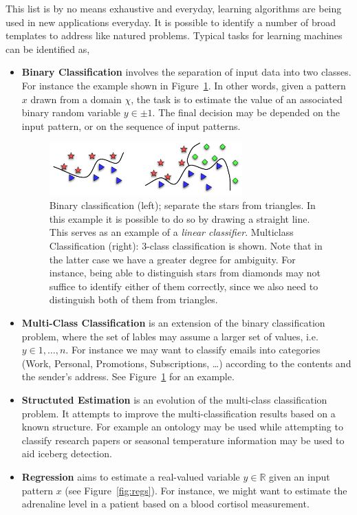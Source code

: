 This list is by no means exhaustive and everyday, learning algorithms are being used in new applications everyday. It is possible to identify a number of broad templates to address like natured problems. Typical tasks for learning machines can be identified as,~\cite[7-10]{smolaML}
\begin{itemize}
\item \textbf{Binary Classification} involves the separation of input data into two classes. For instance the example shown in Figure~\ref{fig:binclass}. In other words, given a pattern $x$ drawn from a domain $\chi$, the task is to estimate the value of an associated binary random variable $y \in {\pm1}$. The final decision may be depended on the input pattern, or on the sequence of input patterns. 

	\begin{figure}
	\centering
	\includegraphics[width=0.7\textwidth]{Figures/classification}
	\caption[Illustration of classification.]{Binary classification (left); separate the stars from triangles. In this example it is possible to do so by drawing a straight line. This serves as an example of a \emph{linear classifier}. Multiclass Classification (right): 3-class classification is shown. Note that in the
	latter case we have a greater degree for ambiguity. For instance, being able to
	distinguish stars from diamonds may not suffice to identify either of them correctly,
	since we also need to distinguish both of them from triangles.}
	\label{fig:binclass}
	\end{figure}	

\item \textbf{Multi-Class Classification} is an extension of the binary classification problem, where the set of lables may assume a larger set of values, i.e. $y \in {1,\ldots,n}$. For instance we may want to classify emails into categories (Work, Personal, Promotions, Subscriptions, \ldots) according to the contents and the sender's address.  See Figure~\ref{fig:binclass} for an example. 
\item \textbf{Structuted Estimation} is an evolution of the multi-class classification problem. It attempts to improve the multi-classification results based on a known structure. For example an ontology may be used while attempting to classify research papers or seasonal temperature information may be used to aid iceberg detection.
\item \textbf{Regression} aims to estimate a real-valued variable $y\in\mathbb{R}$ given an input pattern $x$ (see Figure~\ref{fig:regs}). For instance, we might want to estimate the adrenaline level in a patient based on a blood cortisol measurement.


\end{itemize}
